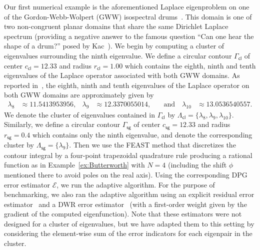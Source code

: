 \documentclass[12pt, oneside, reqno]{amsart}
\theoremstyle{remark}
\newcommand{\EE}{\mathcal{E}}
\begin{document}
Our first numerical example is the aforementioned Laplace eigenproblem on
one of the Gordon-Webb-Wolpert (GWW) isospectral
drums~\cite{GorWebWol1992-1, Dri1997-1}.  This domain is one of two
non-congruent planar domains that share the same Dirichlet Laplace
spectrum (providing a negative answer to the famous question ``Can one
hear the shape of a drum?'' posed by Kac~\cite{Kac1966-1}).
We begin by computing a cluster of eigenvalues surrounding the
ninth eigenvalue.
We define a circular contour \(\Gamma_\mathsf{cl}\) of
center \(c_\mathsf{cl} = 12.33\) and radius \(r_\mathsf{cl} = 1.00\)
which contains the eighth, ninth and tenth eigenvalues of the Laplace operator
associated with both GWW domains.
As reported in~\cite{Dri1997-1},
the eighth, ninth and tenth eigenvalues of the Laplace operator on both GWW
domains are approximately given by
\begin{align*}
  \lambda_8 & \approx 11.5413953956, &
  \lambda_9 & \approx 12.3370055014, & \quad \text{and} \quad
  \lambda_{10} & \approx 13.0536540557.
\end{align*}
We denote the cluster of eigenvalues contained in \(\Gamma_\mathsf{cl}\)
by \(\Lambda_\mathsf{cl} = \{\lambda_8, \lambda_9, \lambda_{10}\}\).
Similarly, we define a circular contour \(\Gamma_\mathsf{sg}\) of
center \(c_\mathsf{sg} = 12.33\) and radius \(r_\mathsf{sg} = 0.4\)
which contains only the ninth eigenvalue, and denote the corresponding
cluster by \(\Lambda_\mathsf{sg} = \{\lambda_9\}\).
Then we use the FEAST method that discretizes the contour integral by
a four-point trapezoidal quadrature rule producing a rational function
as in Example~\ref{ex:Butterworth} with $N=4$ (including the shift
$\phi$ mentioned there to avoid poles on the real axis).
Using the corresponding DPG error estimator $\EE$, we run the adaptive
algorithm.
For the purpose of benchmarking, we also ran the adaptive algorithm using
an explicit residual error estimator~\cite[Section 3.2]{Lar2000-1}
and a DWR error estimator~\cite[Equation (85)]{HeuRan2001-1} (with a
first-order weight given by the gradient of the computed eigenfunction).
Note that these estimators were not designed for a cluster of eigenvalues,
but we have adapted them to this setting by considering the
element-wise sum of the error indicators for each eigenpair
in the cluster.
\end{document}
